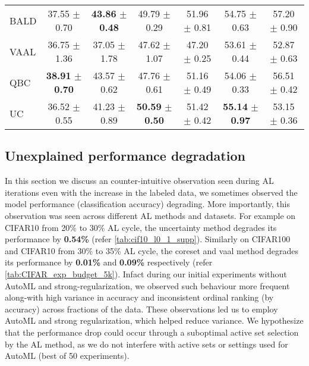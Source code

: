 \documentclass[10pt,twocolumn,letterpaper]{article}
\begin{document}
\begin{table*}[ht]
{\begin{tabular}{l|cccccc}
BALD &  37.55 $\pm$ 0.70 & \textbf{43.86} $\pm$ \textbf{0.48} & 49.79 $\pm$ 0.29 & 51.96 $\pm$ 0.81 & 54.75 $\pm$ 0.63 & 57.20 $\pm$ 0.90\\

VAAL &  36.75 $\pm$ 1.36 & 37.05 $\pm$ 1.78 & 47.62 $\pm$ 1.07 & 47.20 $\pm$ 0.25 & 53.61 $\pm$ 0.44 & 52.87 $\pm$ 0.63\\

QBC &  \textbf{38.91} $\pm$ \textbf{0.70} & 43.57 $\pm$ 0.62 & 47.76 $\pm$ 0.61 & 51.16 $\pm$ 0.49 & 54.06 $\pm$ 0.33 & 56.51 $\pm$ 0.42\\

UC &  36.52 $\pm$ 0.55 & 41.23 $\pm$ 0.89 & \textbf{50.59} $\pm$ \textbf{0.50} & 51.42 $\pm$ 0.42 & \textbf{55.14} $\pm$ \textbf{0.97} & 53.15 $\pm$ 0.36\\
\bottomrule
\end{tabular}}
\caption{Mean Accuracy and Standard Deviation on CIFAR10/100 test set with annotation size as $5\%$ of training set. Results reported are averaged over 5 runs where hyper-parameters are tuned in the first run using AutoML random search over 50 trials.}
\label{tab:CIFAR_exp_budget_5k}
\end{table*}


\subsection{Unexplained performance degradation}

In this section we discuss an counter-intuitive observation seen during AL iterations \ie even with the increase in the labeled data, we sometimes observed the model performance (classification accuracy) degrading. More importantly, this observation was seen across different AL methods and datasets. For example on CIFAR10 from 20\% to 30\% AL cycle, the uncertainty method degrades its performance by \textbf{0.54\%} (refer \cref{tab:cif10_l0_1_supp}). Similarly on CIFAR100 and CIFAR10 from 30\% to 35\% AL cycle, the coreset and vaal method degrades its performance by \textbf{0.01\%} and \textbf{0.09\%} respectively (refer \cref{tab:CIFAR_exp_budget_5k}). Infact during our initial experiments without AutoML and strong-regularization, we observed such behaviour more frequent along-with high variance in accuracy and inconsistent ordinal ranking (by accuracy) across fractions of the data. These observations led us to employ AutoML and  strong regularization, which helped reduce variance. We hypothesize that the performance drop could occur through a suboptimal active set selection by the AL method, as we do not interfere with active sets or settings used for AutoML (best of 50 experiments).
\end{document}
